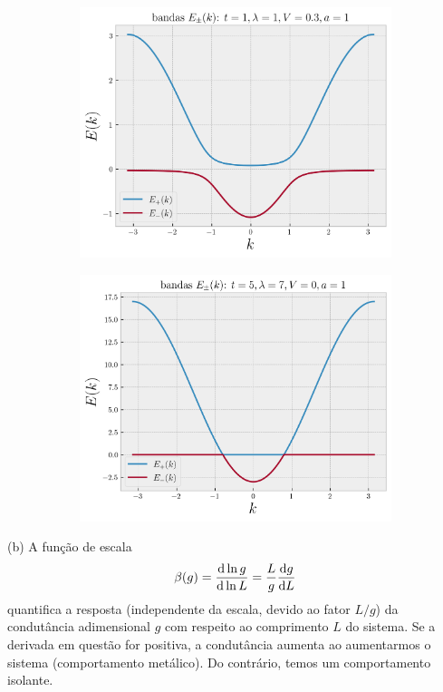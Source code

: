 \documentclass[a4paper,10pt]{article}
\begin{document}
\begin{figure}[H]
\centering
\begin{subfigure}{.46\textwidth}
  \centering
  \includegraphics[width=0.95\linewidth]{fig/bandas-anderson3.png}
  \label{fig:bandas-anderson3}
\end{subfigure}
\begin{subfigure}{.46\textwidth}
  \centering
  \includegraphics[width=0.95\linewidth]{fig/bandas-anderson4.png}
  \label{fig:bandas-anderson4}
\end{subfigure}
\label{fig:bandas-anderson12}
\end{figure}

(b) A função de escala
$$
\beta(g) = \dv{\ln g}{\ln L} = \frac{L}{g} \dv{g}{L}
$$
quantifica a resposta (independente da escala, devido ao fator $L/g$) da condutância adimensional $g$ com respeito ao comprimento $L$ do sistema. Se a derivada em questão for positiva, a condutância aumenta ao aumentarmos o sistema (comportamento metálico). Do contrário, temos um comportamento isolante.
\end{document}
